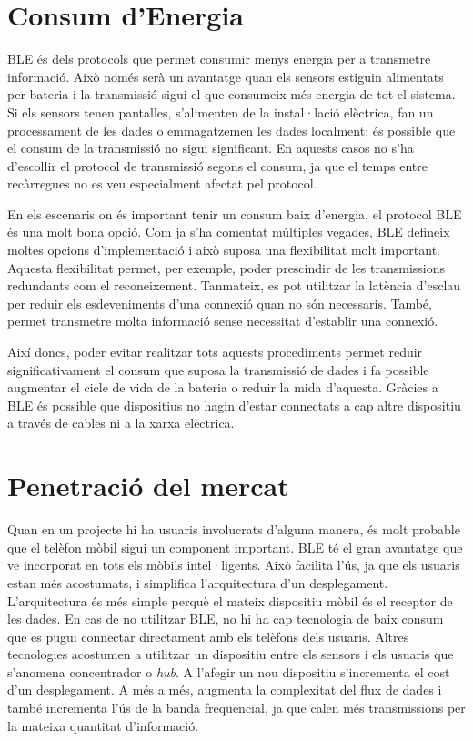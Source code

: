 \section*{Consum d'Energia}

BLE és dels protocols que permet consumir menys energia per a transmetre informació.
Això només serà un avantatge quan els sensors estiguin alimentats per bateria i la transmissió sigui el que consumeix més energia de tot el sistema.
Si els sensors tenen pantalles, s'alimenten de la instal·lació elèctrica, fan un processament de les dades o emmagatzemen les dades localment; és possible que el consum de la transmissió no sigui significant.
En aquests casos no s'ha d'escollir el protocol de transmissió segons el consum, ja que el temps entre recàrregues no es veu especialment afectat pel protocol.

En els escenaris on és important tenir un consum baix d'energia, el protocol BLE és una molt bona opció.
Com ja s'ha comentat múltiples vegades, BLE defineix moltes opcions d'implementació i això suposa una flexibilitat molt important.
Aquesta flexibilitat permet, per exemple, poder prescindir de les transmissions redundants com el reconeixement.
Tanmateix, es pot utilitzar la latència d'esclau per reduir els esdeveniments d'una connexió quan no són necessaris.
També, permet transmetre molta informació sense necessitat d'establir una connexió.

Així doncs, poder evitar realitzar tots aquests procediments permet reduir significativament el consum que suposa la transmissió de dades i fa possible augmentar el cicle de vida de la bateria o reduir la mida d'aquesta.
Gràcies a BLE és possible que dispositius no hagin d'estar connectats a cap altre dispositiu a través de cables ni a la xarxa elèctrica.

\section*{Penetració del mercat}

Quan en un projecte hi ha usuaris involucrats d'alguna manera, és molt probable que el telèfon mòbil sigui un component important.
BLE té el gran avantatge que ve incorporat en tots els mòbils intel·ligents.
Això facilita l'ús, ja que els usuaris estan més acostumats, i simplifica l'arquitectura d'un desplegament.
L'arquitectura és més simple perquè el mateix dispositiu mòbil és el receptor de les dades.
En cas de no utilitzar BLE, no hi ha cap tecnologia de baix consum que es pugui connectar directament amb els telèfons dels usuaris.
Altres tecnologies acostumen a utilitzar un dispositiu entre els sensors i els usuaris que s'anomena concentrador o \textit{hub}.
A l'afegir un nou dispositiu s'incrementa el cost d'un desplegament.
A més a més, augmenta la complexitat del flux de dades i també incrementa l'ús de la banda freqüencial, ja que calen més transmissions per la mateixa quantitat d'informació.

